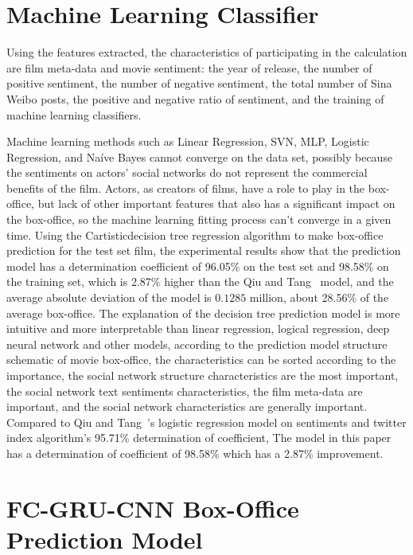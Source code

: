 \documentclass[review]{cvpr}
\begin{document}
\section{Machine Learning Classifier}

Using the features extracted, the characteristics of participating in the calculation are film meta-data and movie sentiment:
the year of release, the number of positive sentiment, the number of negative sentiment, the total number of Sina Weibo posts,
the positive and negative ratio of sentiment, and the training of machine learning classifiers.

Machine learning methods such as Linear Regression, SVN, MLP, Logistic Regression, and Na{\'i}ve Bayes cannot converge on the data set,
possibly because the sentiments on actors' social networks do not represent the commercial benefits of the film.
Actors, as creators of films, have a role to play in the box-office, but lack of other important features that also has a significant impact on the box-office,
so the machine learning fitting process can't converge in a given time.
Using the Cartisticdecision tree regression algorithm to make box-office prediction for the test set film,
the experimental results show that the prediction model has a determination coefficient of 96.05\% on the test set and 98.58\% on the training set, which is 2.87\% higher than the Qiu and Tang~\cite{qiu2018microblog} model,
and the average absolute deviation of the model is $0.1285$ million, about 28.56\% of the average box-office.
The explanation of the decision tree prediction model is more intuitive and more interpretable than linear regression, logical regression, deep neural network and other models,
according to the prediction model structure schematic of movie box-office,
the characteristics can be sorted according to the importance, the social network structure characteristics are the most important,
the social network text sentiments characteristics, the film meta-data are important, and the social network characteristics are generally important.
Compared to Qiu and Tang~\cite{qiu2018microblog}'s logistic regression model on sentiments and twitter index algorithm's 95.71\% determination of coefficient,
The model in this paper has a determination of coefficient of 98.58\% which has a 2.87\% improvement.

\section{FC-GRU-CNN Box-Office Prediction Model}
\end{document}
